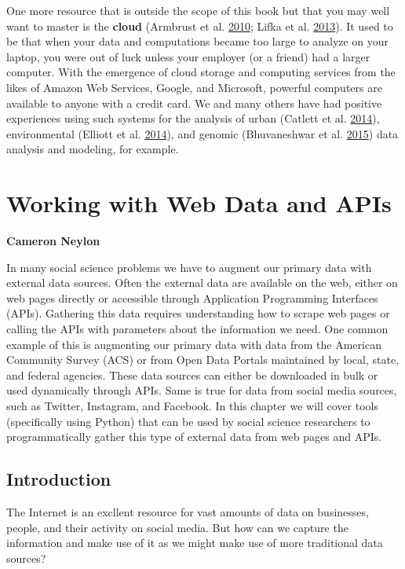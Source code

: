 \documentclass[]{krantz}
\begin{document}
One more resource that is outside the scope of this book but that you
may well want to master is the \textbf{cloud} (Armbrust et al.
\protect\hyperlink{ref-armbrust2010view}{2010}; Lifka et al.
\protect\hyperlink{ref-Lifka}{2013}). It used to be that when your data
and computations became too large to analyze on your laptop, you were
out of luck unless your employer (or a friend) had a larger computer.
With the emergence of cloud storage and computing services from the
likes of Amazon Web Services, Google, and Microsoft, powerful computers
are available to anyone with a credit card. We and many others have had
positive experiences using such systems for the analysis of urban
(Catlett et al. \protect\hyperlink{ref-plenario}{2014}), environmental
(Elliott et al. \protect\hyperlink{ref-elliott2014parallel}{2014}), and
genomic (Bhuvaneshwar et al.
\protect\hyperlink{ref-bhuvaneshwar2015case}{2015}) data analysis and
modeling, for example.

\hypertarget{chap:web}{\chapter{Working with Web Data and
APIs}\label{chap:web}}

\textbf{Cameron Neylon}

In many social science problems we have to augment our primary data with
external data sources. Often the external data are available on the web,
either on web pages directly or accessible through Application
Programming Interfaces (APIs). Gathering this data requires
understanding how to scrape web pages or calling the APIs with
parameters about the information we need. One common example of this is
augmenting our primary data with data from the American Community Survey
(ACS) or from Open Data Portals maintained by local, state, and federal
agencies. These data sources can either be downloaded in bulk or used
dynamically through APIs. Same is true for data from social media
sources, such as Twitter, Instagram, and Facebook. In this chapter we
will cover tools (specifically using Python) that can be used by social
science researchers to programmatically gather this type of external
data from web pages and APIs.

\section{Introduction}\label{introduction}

The Internet is an excllent resource for vast amounts of data on
businesses, people, and their activity on social media. But how can we
capture the information and make use of it as we might make use of more
traditional data sources?
\end{document}
